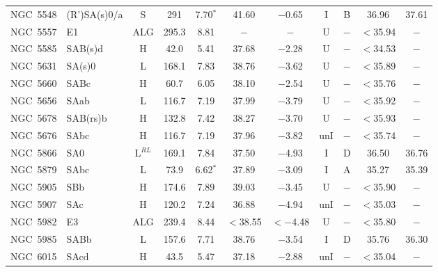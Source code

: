\begin{center}
\begin{longtable}{lC{2.5cm}ccccccccc}
NGC~5548 & (R')SA(s)0/a    & S                 & 291   & 7.70$^{*}$          & 41.60    & $-$0.65     & I   & B        &  36.96   & 37.61          \\
NGC~5557  & E1                &   ALG           &    295.3  &  8.81             &   $-$     &   $-$        &    U   &  $-$      & $<$35.94 & $-$  \\
NGC~5585 & SAB(s)d           & H                 & 42.0    & 5.41                & 37.68    & $-$2.28     & U   &$-$       & $<$34.53 & $-$            \\
NGC~5631 & SA(s)0            & L          & 168.1 & 7.83                & 38.76    & $-$3.62     & U   &$-$        & $<$35.89 & $-$           \\
NGC~5660  & SABc            &   H         &   60.7      &  6.05         &   38.10    &  $-$2.54   &   U  & $-$      & $<$35.76 & $-$  \\
NGC~5656  & SAab            &    L         &   116.7    &  7.19         &   37.99    &  $-$3.79   &  U   &  $-$      & $<$35.92 & $-$ \\
NGC~5678 & SAB(rs)b          & H                 & 132.8 & 7.42                & 38.27    & $-$3.70       & U   &$-$       & $<$35.93 & $-$            \\
NGC~5676  & SAbc              &  H               &   116.7    &  7.19         &  37.96    &  $-$3.82     & unI  & $-$      & $<$35.74 & $-$  \\
NGC~5866  & SA0                &  L$^{RL}$               &   169.1    & 7.84           &   37.50    &  $-$4.93    &   I    & D  &  36.50   &  36.76    \\
NGC~5879  & SAbc              &   L            &   73.9       &   6.62$^{*}$  &  37.89   &  $-$3.09    & I  & A   &   35.27    &   35.39   \\
NGC~5905  & SBb                &   H          &   174.6      &  7.89           &   39.03    &  $-$3.45    &  U  &  $-$      & $<$35.90 & $-$  \\
NGC~5907  & SAc              &     H         &  120.2       &  7.24          &   36.88     &  $-$4.94     & unI  & $-$      & $<$35.03 & $-$  \\
NGC~5982  & E3                &  ALG        &    239.4     &  8.44          &  $<$38.55   & $<-$4.48 &   U & $-$      & $<$35.80 & $-$  \\
NGC~5985  & SABb            &   L           &  157.6        &  7.71          &   38.76      &   $-$3.54   &  I  & D   &  35.76   & 36.30    \\
NGC~6015  & SAcd           &  H            &  43.5         &   5.47        &   37.18      &  $-$2.88      & unI & $-$      & $<$35.04 & $-$  \\

\end{longtable}
\end{center}
